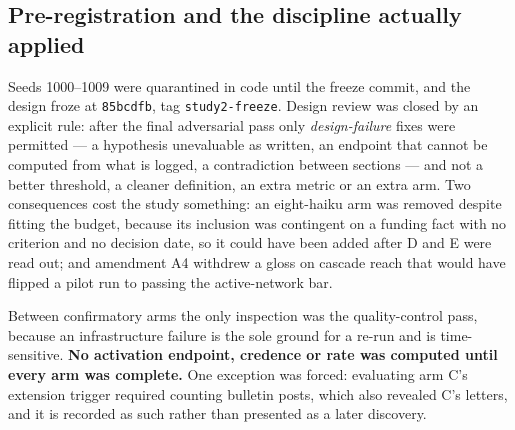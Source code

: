 \documentclass[pdflatex,sn-basic]{sn-jnl}
\begin{document}
\hypertarget{pre-registration-and-the-discipline-actually-applied}{%
\subsection{Pre-registration and the discipline actually applied}\label{pre-registration-and-the-discipline-actually-applied}}

Seeds 1000--1009 were quarantined in
code until the freeze commit, and the design froze at \texttt{85bcdfb}, tag \texttt{study2-freeze}. Design
review was closed by an explicit rule: after the final adversarial pass only \emph{design-failure}
fixes were permitted --- a hypothesis unevaluable as written, an endpoint that cannot be computed
from what is logged, a contradiction between sections --- and not a better threshold, a cleaner
definition, an extra metric or an extra arm. Two consequences cost the study something: an eight-haiku arm was removed despite fitting
the budget, because its inclusion was contingent on a funding fact with no criterion and no decision
date, so it could have been added after D and E were read out; and amendment A4 withdrew a
gloss on cascade reach that would have flipped a pilot run to passing the active-network
bar.

Between confirmatory arms the only inspection was the quality-control pass, because an
infrastructure failure is the sole ground for a re-run and is time-sensitive. \textbf{No
activation endpoint, credence or rate was computed until every arm was complete.} One
exception was forced: evaluating arm C's extension trigger required counting bulletin
posts, which also revealed C's letters, and it is recorded as such rather than presented
as a later discovery.
\end{document}
